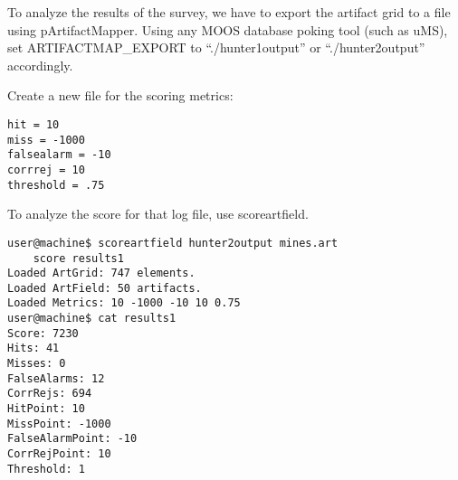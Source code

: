 To analyze the results of the survey, we have to export the artifact grid to a file using pArtifactMapper.  Using any MOOS database poking tool (such as uMS), set ARTIFACTMAP\_EXPORT to ``./hunter1output'' or ``./hunter2output'' accordingly.

Create a new file for the scoring metrics:

\scriptsize
\begin{verbatim}
hit = 10
miss = -1000
falsealarm = -10
corrrej = 10
threshold = .75
\end{verbatim}
\normalsize

To analyze the score for that log file, use scoreartfield.
\scriptsize
\begin{verbatim}
user@machine$ scoreartfield hunter2output mines.art
	score results1
Loaded ArtGrid: 747 elements.
Loaded ArtField: 50 artifacts.
Loaded Metrics: 10 -1000 -10 10 0.75
user@machine$ cat results1
Score: 7230
Hits: 41
Misses: 0
FalseAlarms: 12
CorrRejs: 694
HitPoint: 10
MissPoint: -1000
FalseAlarmPoint: -10
CorrRejPoint: 10
Threshold: 1
\end{verbatim}
\normalsize
